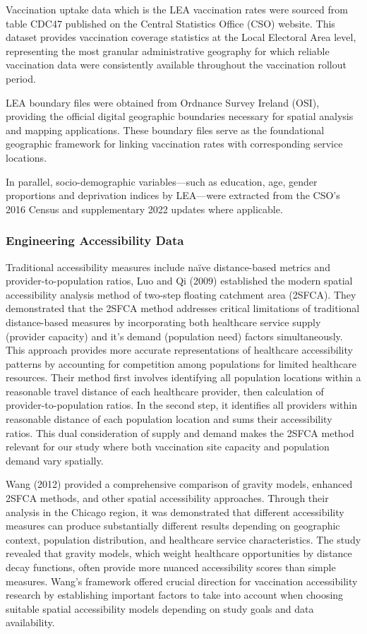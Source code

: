 \documentclass{article}
\begin{document}
Vaccination uptake data which is the LEA vaccination rates were sourced
from table CDC47 published on the Central Statistics Office (CSO)
website. This dataset provides vaccination coverage statistics at the
Local Electoral Area level, representing the most granular
administrative geography for which reliable vaccination data were
consistently available throughout the vaccination rollout period.

LEA boundary files were obtained from Ordnance Survey Ireland (OSI),
providing the official digital geographic boundaries necessary for
spatial analysis and mapping applications. These boundary files serve as
the foundational geographic framework for linking vaccination rates with
corresponding service locations.

In parallel, socio-demographic variables---such as education, age,
gender proportions and deprivation indices by LEA---were extracted from
the CSO's 2016 Census and supplementary 2022 updates where applicable.

\subsubsection{Engineering Accessibility
Data}\label{engineering-accessibility-data}

Traditional accessibility measures include naïve distance-based metrics
and provider-to-population ratios, Luo and Qi (2009) established the
modern spatial accessibility analysis method of two-step floating
catchment area (2SFCA). They demonstrated that the 2SFCA method
addresses critical limitations of traditional distance-based measures by
incorporating both healthcare service supply (provider capacity) and
it's demand (population need) factors simultaneously. This approach
provides more accurate representations of healthcare accessibility
patterns by accounting for competition among populations for limited
healthcare resources. Their method first involves identifying all
population locations within a reasonable travel distance of each
healthcare provider, then calculation of provider-to-population ratios.
In the second step, it identifies all providers within reasonable
distance of each population location and sums their accessibility
ratios. This dual consideration of supply and demand makes the 2SFCA
method relevant for our study where both vaccination site capacity and
population demand vary spatially.

Wang (2012) provided a comprehensive comparison of gravity models,
enhanced 2SFCA methods, and other spatial accessibility approaches.
Through their analysis in the Chicago region, it was demonstrated that
different accessibility measures can produce substantially different
results depending on geographic context, population distribution, and
healthcare service characteristics. The study revealed that gravity
models, which weight healthcare opportunities by distance decay
functions, often provide more nuanced accessibility scores than simple
measures. Wang's framework offered crucial direction for vaccination
accessibility research by establishing important factors to take into
account when choosing suitable spatial accessibility models depending on
study goals and data availability.
\end{document}
